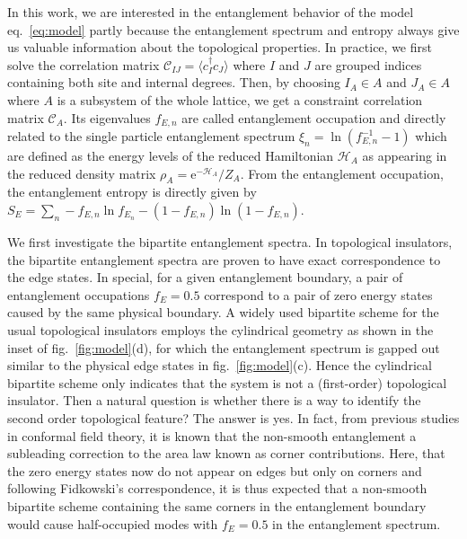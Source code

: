 \documentclass[doublecol]{epl2} %
\newcommand{\me}{\mathrm{e}}
\begin{document}
In this work, we are interested in the entanglement behavior of the model eq.~\ref{eq:model} partly because the entanglement spectrum and entropy always give us valuable information about the topological properties. In practice, we first solve the correlation matrix $\mathcal{C}_{IJ}=\langle c_I^\dag c_J \rangle$ where $I$ and $J$ are grouped indices containing both site and internal degrees. Then, by choosing $I_A\in A$ and $J_A\in A$ where $A$ is a subsystem of the whole lattice, we get a constraint correlation matrix $\mathcal{C}_A$. \cite{Peschel_JPAMG_2003, Ryu_PRB_2006} Its eigenvalues $f_{E,n}$ are called entanglement occupation and directly related to the single particle entanglement spectrum $\xi_n=\ln\left(f_{E,n}^{-1}-1\right)$ which are defined as the energy levels of the reduced Hamiltonian $\mathcal{H}_A$ as appearing in the reduced density matrix $\rho_A=\me^{-\mathcal{H}_A}/Z_A$. From the entanglement occupation, the entanglement entropy is directly given by $S_E=\sum_n -f_{E,n}\ln f_{E_n} - (1-f_{E,n})\ln(1-f_{E,n}) $. 



We first investigate the bipartite entanglement spectra. In topological insulators, the bipartite entanglement spectra are proven to have exact correspondence to the edge states. \cite{Fidkowski_PRL_2010} In special, for a given entanglement boundary, a pair of entanglement occupations $f_{E}=0.5$ correspond to a pair of zero energy states caused by the same physical boundary. A widely used bipartite scheme for the usual topological insulators employs the cylindrical geometry as shown in the inset of fig.~\ref{fig:model}(d), for which the entanglement spectrum is gapped out similar to the physical edge states in fig.~\ref{fig:model}(c). Hence the cylindrical bipartite scheme only indicates that the system is not a (first-order) topological insulator. Then a natural question is whether there is a way to identify the second order topological feature? The answer is yes. In fact, from previous studies in conformal field theory, it is known that the non-smooth entanglement  a subleading correction to the area law known as corner contributions. \cite{Laflorencie_PR_2016} Here,  that the zero energy states now do not appear on edges but only on corners and following Fidkowski's correspondence, it is thus expected that a non-smooth bipartite scheme containing the same corners in the entanglement boundary would cause half-occupied modes with $f_E=0.5$ in the entanglement spectrum.
\end{document}
